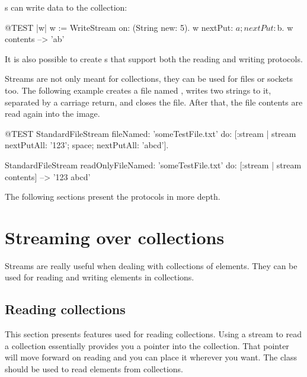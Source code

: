 \documentclass[a4paper,10pt,twoside]{book}
\begin{document}
s can write data to the collection:
\begin{code}{@TEST |w|}
w := WriteStream on: (String new: 5).
w nextPut: $a; nextPut: $b.
w contents -->  'ab'
\end{code}

It is also possible to create s that support both the reading and writing protocols.

Streams are not only meant for collections, they can be used for files or sockets too.
The following example creates a file named , writes two strings to it, separated by a carriage return, and closes the file.
After that, the file contents are read again into the image.

\begin{code}{@TEST}
StandardFileStream
  fileNamed: 'someTestFile.txt'
  do: [:stream | stream
        nextPutAll: '123';
        space;
        nextPutAll: 'abcd'].

StandardFileStream readOnlyFileNamed: 'someTestFile.txt' do: [:stream | stream contents] --> '123 abcd'
\end{code}

The following sections present the protocols in more depth.

\section{Streaming over collections}

Streams are really useful when dealing with collections of elements.
They can be used for reading and writing elements in collections.

\subsection{Reading collections}

This section presents features used for reading collections.
Using a stream to read a collection essentially provides you a pointer into the collection.
That pointer will move forward on reading and you can place it wherever you want.
The class  should be used to read elements from collections.
\end{document}
